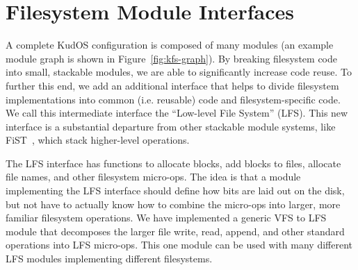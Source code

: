 \preparagraphspacing{}
\section*{Filesystem Module Interfaces}
\label{sec:interfaces}

A complete KudOS configuration is composed of many modules (an example module
graph is shown in Figure~\ref{fig:kfs-graph}). By breaking filesystem code into
small, stackable modules, we are able to significantly increase code reuse. To
further this end, we add an additional interface that helps to divide filesystem
implementations into common (i.e. reusable) code and filesystem-specific code.
We call this intermediate interface the ``Low-level File System'' (LFS). This
new interface is a substantial departure from other stackable module systems,
like FiST~\cite{zadok00fist}, which stack higher-level operations.

The LFS interface has functions to allocate blocks, add blocks to files,
allocate file names, and other filesystem micro-ops. The idea is that a module
implementing the LFS interface should define how bits are laid out on the disk,
but not have to actually know how to combine the micro-ops into larger, more
familiar filesystem operations. We have implemented a generic VFS to LFS module
that decomposes the larger file write, read, append, and other standard
operations into LFS micro-ops. This one module can be used with many different
LFS modules implementing different filesystems.
